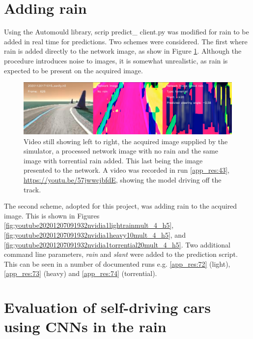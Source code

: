 \section{Adding rain}
\label{res:adding-rain-section}
Using the Automould library, scrip predict\_ client.py was modified for rain to be added in real time for predictions. Two schemes were considered. The first where rain is added directly to the network image, as show in Figure \ref{fig:tcpflow_Run43}. Although the procedure introduces noise to images, it is somewhat unrealistic, as rain is expected to be present on the acquired image.
\begin{figure}[ht]
 \centering 
 \includegraphics[width=\textwidth]{Figures/tcpflow_Run43.png}
 \caption{Video still showing left to right, the acquired image supplied by the simulator, a processed network image with no rain and the same image with torrential rain added. This last being the image presented to the network. A video was recorded in run \ref{app_res:43}, \url{https://youtu.be/57jwwcjbfdE}, showing the model driving off the track.}
 \label{fig:tcpflow_Run43} 
\end{figure}
The second scheme, adopted for this project, was adding rain to the acquired image. This is shown in Figures  \ref{fig:youtube20201207091932nvidia1lightrainmult_4_h5},
\ref{fig:youtube20201207091932nvidia1heavy10mult_4_h5}, and
 \ref{fig:youtube20201207091932nvidia1torrential20mult_4_h5}. 
Two additional command line parameters, \textit{rain} and \textit{slant} were added to the prediction script. This can be seen in a number of documented runs e.g. \ref{app_res:72} (light), \ref{app_res:73} (heavy) and \ref{app_res:74} (torrential).


\section{Evaluation of self-driving cars using CNNs in the rain}

